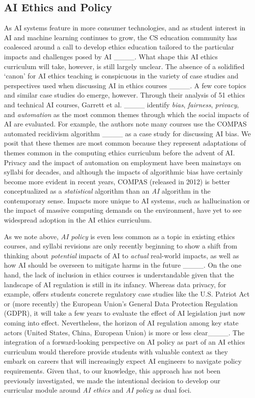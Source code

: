 \subsection*{AI Ethics and Policy}

As AI systems feature in more consumer technologies, and as student interest in AI and machine learning continues to grow, the CS education community has coalesced around a call to develop ethics education tailored to the particular impacts and challenges posed by AI ____. What shape this AI ethics curriculum will take, however, is still largely unclear. The absence of a solidified `canon' for AI ethics teaching is conspicuous in the variety of case studies and perspectives used when discussing AI in ethics courses ____. A few core topics and similar case studies do emerge, however. Through their analysis of 51 ethics and technical AI courses, Garrett et al. ____ identify \textit{bias}, \textit{fairness}, \textit{privacy}, and \textit{automation} as the most common themes through which the social impacts of AI are evaluated. For example, the authors note many courses use the COMPAS automated recidivism algorithm ____ as a case study for discussing AI bias. We posit that these themes are most common because they represent adaptations of themes common in the computing ethics curriculum before the advent of AI. Privacy and the impact of automation on employment have been mainstays on syllabi for decades, and although the impacts of algorithmic bias have certainly become more evident in recent years, COMPAS (released in 2012) is better conceptualized as a \textit{statistical} algorithm than an \textit{AI} algorithm in the contemporary sense. Impacts more unique to AI systems, such as hallucination or the impact of massive computing demands on the environment, have yet to see widespread adoption in the AI ethics curriculum.

As we note above, \textit{AI policy} is even less common as a topic in existing ethics courses, and syllabi revisions are only recently beginning to show a shift from thinking about \textit{potential} impacts of AI to \textit{actual} real-world impacts, as well as how AI should be overseen to mitigate harms in the future ____. On the one hand, the lack of inclusion in ethics courses is understandable given that the landscape of AI regulation is still in its infancy. Whereas data privacy, for example, offers students concrete regulatory case studies like the U.S. Patriot Act or (more recently) the European Union's General Data Protection Regulation (GDPR), it will take a few years to evaluate the effect of AI legislation just now coming into effect. Nevertheless, the horizon of AI regulation among key state actors (United States, China, European Union) is more or less clear____. The integration of a forward-looking perspective on AI policy as part of an AI ethics curriculum would therefore provide students with valuable context as they embark on careers that will increasingly expect AI engineers to navigate policy requirements. Given that, to our knowledge, this approach has not been previously investigated, we made the intentional decision to develop our curricular module around \textit{AI ethics} and \textit{AI policy} as dual foci.
